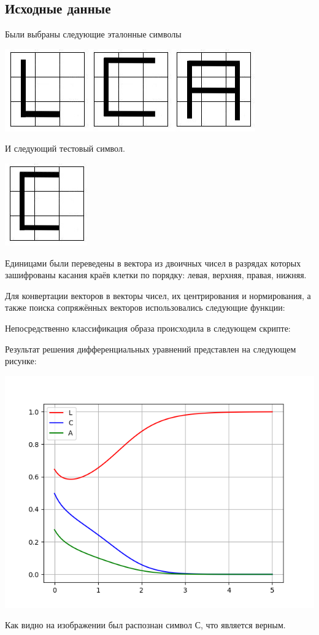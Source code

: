\documentclass[a4paper, 12pt]{article}
\begin{document}
\subsection{Исходные данные}
Были выбраны следующие эталонные символы
\begin{center}
  \centering
  \includegraphics[width=.7\linewidth]{extra/input.jpg}
  \label{fig:prplot}
\end{center}
И следующий тестовый символ.
\begin{center}
  \centering
  \includegraphics[width=.3\linewidth]{extra/test.jpg}
  \label{fig:prplot}
\end{center}
Единицами были переведены в вектора из двоичных чисел в разрядах которых зашифрованы касания краёв клетки по порядку: левая, верхняя, правая, нижняя.

Для конвертации векторов в векторы чисел, их центрирования и нормирования, а также поиска сопряжённых векторов использовались следующие функции:

Непосредственно классификация образа происходила в следующем скрипте:


Результат решения дифференциальных уравнений представлен на следующем рисунке:
\begin{center}
  \centering
  \includegraphics[width=.7\linewidth]{extra/output.png}
  \label{fig:prplot}
\end{center}
Как видно на изображении был распознан символ С, что является верным.
\newpage
\end{document}
